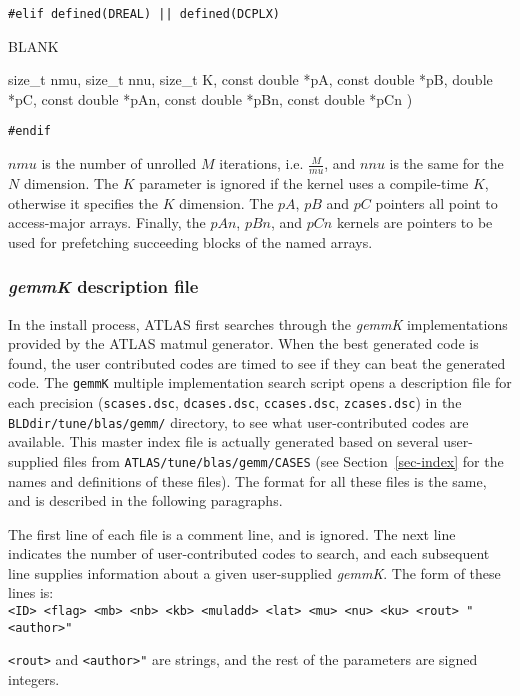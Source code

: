 \documentclass[11pt]{article}
\newenvironment{routdef}[1]
{
   \begin{list}{BLANK}
   {
      \setlength{\parsep}{0in}
      \setlength{\itemsep}{.01in}
      \setlength{\partopsep}{0in}
      \setlength{\topsep}{0.1in}
      \setlength{\labelsep}{0in}
      \setlength{\labelwidth}{#1in}
      \setlength{\leftmargin}{#1in}
   }
} {\end{list}}
\newcommand{\rditem}[2]{\item[#1\hfill(~]#2 )}
\begin{document}
\noindent
\verb+#elif defined(DREAL) || defined(DCPLX)+
\begin{routdef}{1.8}
\rditem{~~~void ATL\_USERMM}
{size\_t nmu, size\_t nnu, size\_t K, const double *pA, const double *pB, 
 double *pC, const double *pAn, const double *pBn, const double *pCn}
\end{routdef}

\noindent
\verb+#endif+

$nmu$ is the number of unrolled $M$ iterations, i.e. $\frac{M}{mu}$, and
$nnu$ is the same for the $N$ dimension.  The $K$ parameter is ignored if
the kernel uses a compile-time $K$, otherwise it specifies the $K$ dimension.
The $pA$, $pB$ and $pC$ pointers all point to access-major arrays.
Finally, the $pAn$, $pBn$, and $pCn$ kernels are pointers to be used for
prefetching succeeding blocks of the named arrays.

\subsubsection{{\it gemmK} description file}
In the install process, ATLAS first searches through the {\it gemmK}
implementations provided by the ATLAS matmul generator.  When the
best generated code is found, the user contributed codes are timed
to see if they can beat the generated code.  The {\tt gemmK} multiple
implementation search
script opens a description file for each precision 
({\tt scases.dsc}, {\tt dcases.dsc}, {\tt ccases.dsc}, {\tt zcases.dsc})
in the {\tt BLDdir/tune/blas/gemm/} directory,
to see what user-contributed codes are available.  This master index
file is actually generated based on several user-supplied files from
{\tt ATLAS/tune/blas/gemm/CASES} (see Section~\ref{sec-index} for the
names and definitions of these files).  The format for all these files
is the same, and is described in the following paragraphs.

The first line of each file is a comment line, and is ignored.  The next
line indicates the number of user-contributed codes to search, and
each subsequent line supplies information about a given user-supplied
{\it gemmK}.  The form of these lines is:\\
\verb+<ID> <flag> <mb> <nb> <kb> <muladd> <lat> <mu> <nu> <ku> <rout> "<author>"+

\verb+<rout>+ and \verb+<author>"+ are strings, and the rest of the
parameters are signed integers.  
\end{document}
